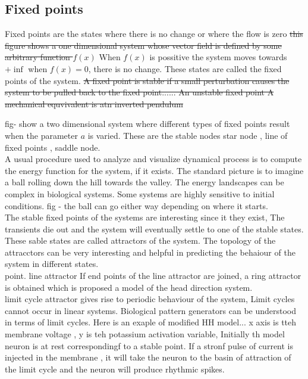 \subsection{Fixed points}
Fixed points are the states where there is no change or where the flow is zero \st{this figure shows a one dimensional system whose vector field is defined by some arbitrary function $f(x)$} When $f(x)$ is possitive the system moves towards $+ \inf$ when $f(x) = 0$, there is no change. These states are called the fixed points of the system.\st{ A fixed point is stable if a small perturbation causes the system to be pulled back to the fixed point...... An unstable fixed point  A mechanical equvivalent is atn inverted pendulum}

fig- show a two dimensional system where different types of fixed points result when the parameter $a$ is varied. These are the stable nodes star node , line of fixed points , saddle node. \\

A usual procedure used to analyze and visualize dynamical process is to compute the energy function for the system, if it exists. The standard picture is to imagine a ball rolling down the hill towards the valley. The energy landscapes can be complex in biological systems. Some systems are highly sensitive to initial conditions. fig - the ball can go either way depending on where it starts. \\
The stable fixed points of the systems are interesting since it they exist, The transients die out and the system will eventually settle to one of the stable states. These sable states are called attractors of the system. The topology of the attracctors can be very interesting and helpful in predicting the behaiour of the system in different states. \\
point. line attractor If end points of the line attractor are joined, a ring attractor is obtained which is proposed a model of the head direction system. \\
limit cycle attractor gives rise to periodic behaviour of the system, Limit cycles cannot occur in linear systems. Biological pattern generators can be understood in terms of limit cycles. Here is an exaple of modified HH model... x axis is tteh membrane voltage , y is teh potassium activation variable, Initially th model neuron is at rest correspondingf to a stable point. If a stronf pulse of current is injected in the membrane , it will take the neuron to the basin of attraction of the limit cycle and the neuron will produce rhythmic spikes. \\


